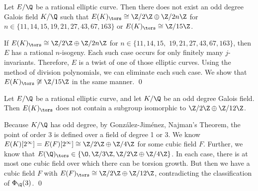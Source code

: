 \begin{frame}[plain,t]
\begin{lem} 
Let $E/\Q$ be a rational elliptic curve. Then there does not exist an odd degree Galois field $K/\Q$ such that $E(K)_\tors \cong \Z/2\Z \oplus \Z/2n\Z$ for $n \in \{ 11, 14, 15, 19, 21, 27, 43, 67, 163 \}$ or $E(K)_\tors \cong \Z/15\Z$. 
\end{lem} \pspace

\pfsk If $E(K)_\tors \cong \Z/2\Z \oplus \Z/2n\Z$ for $n \in \{ 11, 14, 15,$ $19, 21, 27, 43, 67, 163 \}$, then $E$ has a rational $n$-isogeny. Each such case occurs for only finitely many $j$-invariants. Therefore, $E$ is a twist of one of those elliptic curves. Using the method of division polynomials, we can eliminate each such case. We show that $E(K)_\tors \not\cong \Z/15\Z$ in the same manner. \hfill\qed
\end{frame}





\begin{frame}[plain]
\begin{lem}
Let $E/\Q$ be a rational elliptic curve, and let $K/\Q$ be an odd degree Galois field. Then $E(K)_\tors$ does not contain a subgroup isomorphic to $\Z/2\Z \oplus \Z/12\Z$.
\end{lem} \pspace

\pfsk Because $K/\Q$ has odd degree, by Gonz\'alez-Jim\'enez, Najman's Theorem, the point of order 3 is defined over a field of degree 1 or 3. We know $E(K)[2^\infty]= E(F)[2^\infty] \cong \Z/2\Z \oplus \Z/4\Z$ for some cubic field $F$. Further, we know that $E(\Q)_\tors \in \{ \O, \Z/3\Z, \Z/2\Z \oplus \Z/4\Z \}$. In each case, there is at most one cubic field over which there can be torsion growth. But then we have a cubic field $F$ with $E(F)_\tors \cong \Z/2\Z \oplus \Z/12\Z$, contradicting the classification of $\Phi_\Q(3)$. \hfill\qed
\end{frame}





